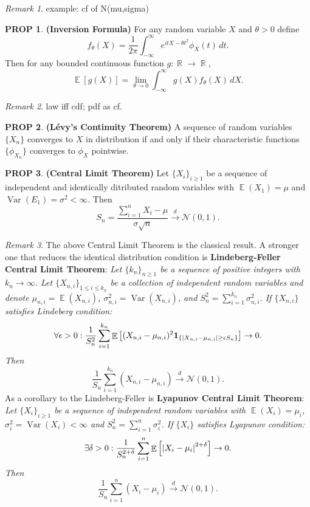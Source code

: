 \documentclass[hidelinks,11pt]{article}
\theoremstyle{definition}
\theoremstyle{dotless}
\newtheorem{prop}{PROP}[section]
\theoremstyle{remark}
\newtheorem*{remark}{Remark}
\DeclareMathOperator{\Var}{Var}
\DeclareMathOperator{\E}{\mathbb{E}}
\DeclareMathOperator{\R}{\mathbb{R}}
\DeclareMathOperator{\1}{\mathbf{1}}
\begin{document}
\begin{remark}
example: cf of N(mu,sigma)
\end{remark}

\begin{prop}\textup{\textbf{(Inversion Formula)}} For any random variable $X$ and $\theta>0$ define
\[f_\theta(X)=\frac{1}{2\pi}\int_{-\infty}^\infty e^{itX-\theta t^2}\phi_X(t)\,dt.\]
Then for any bounded continuous function $g:\R\to\R$,
\[\E[g(X)]=\lim_{\theta\to0}\int_{-\infty}^\infty g(X)f_\theta(X)\,dX.\]
\end{prop}

\begin{remark}
law iff cdf; pdf as cf.
\end{remark}

\begin{prop}\textup{\textbf{(Lévy's Continuity Theorem)}} A sequence of random variables $\{X_n\}$ converges to $X$ in distribution if and only if their characteristic functions $\{\phi_{X_n}\}$ converges to $\phi_X$ pointwise.
\end{prop}

\begin{prop}\textup{\textbf{(Central Limit Theorem)}} Let $\{X_i\}_{i\geq1}$ be a sequence of independent and identically ditributed random variables with $\E(X_1)=\mu$ and $\Var(E_1)=\sigma^2<\infty$. Then
\[S_n=\frac{\sum_{i=1}^nX_i-\mu}{\sigma\sqrt{n}}\xrightarrow{d}\mathcal{N}(0,1).\]
\end{prop}

\begin{remark}
The above Central Limit Theorem is the classical result. A stronger one that reduces the identical distribution condition is \textbf{Lindeberg-Feller Central Limit Theorem}:\smallbreak
\textit{Let $\{k_n\}_{n\geq1}$ be a sequence of positive integers with $k_n\to\infty$. Let $\{X_{n,i}\}_{1\leq i\leq k_n}$ be a collection of independent random variables and denote $\mu_{n,i}=\E(X_{n,i})$, $\sigma_{n,i}^2=\Var(X_{n,i})$, and $S_n^2=\sum_{i=1}^{k_n}\sigma_{n,i}^2$. If $\{X_{n,i}\}$ satisfies Lindeberg condition:}
\[\forall\epsilon>0:\frac{1}{S_n^2}\sum_{i=1}^{k_n}\E\left[(X_{n,i}-\mu_{n,i})^2\textbf{1}_{\{\abs{X_{n,i}-\mu_{n,i}}\geq\epsilon S_n\}}\right]\to0.\]
\textit{Then}
\[\frac{1}{S_n}\sum_{i=1}^{k_n}(X_{n,i}-\mu_{n,i})\xrightarrow{d}\mathcal{N}(0,1).\]
As a corollary to the Lindeberg-Feller is \textbf{Lyapunov Central Limit Theorem}:\smallbreak
\textit{Let $\{X_i\}_{i\geq1}$ be a sequence of independent random variables with $\E(X_i)=\mu_i$, $\sigma_i^2=\Var(X_i)<\infty$ and $S_n^2=\sum_{i=1}^n\sigma_i^2$. If $\{X_i\}$ satisfies Lyapunov condition:}
\[\exists\delta>0:\frac{1}{S_n^{2+\delta}}\sum_{i=1}^n\E\left[\abs{X_i-\mu_i}^{2+\delta}\right]\to0.\]
\textit{Then}
\[\frac{1}{S_n}\sum_{i=1}^n(X_i-\mu_i)\xrightarrow{d}\mathcal{N}(0,1).\]
\end{remark}
\end{document}
